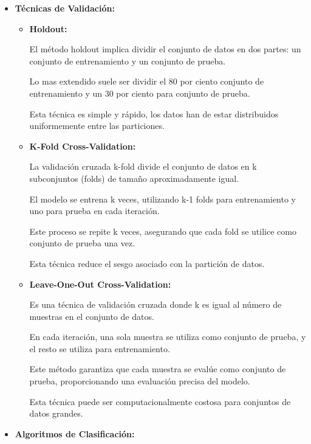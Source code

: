 \begin{itemize}

\item
\textbf{Técnicas de Validación:}

	\begin{itemize}
	
	\item
	\textbf{Holdout:}
	
	El método holdout implica dividir el conjunto de datos en dos partes: un conjunto de entrenamiento y un conjunto de prueba.
	
	Lo mas extendido suele ser dividir el 80 por ciento conjunto de entrenamiento y un 30 por ciento para conjunto de prueba.
	
	Esta técnica es simple y rápido, los datos han de estar distribuidos uniformemente entre las particiones.

	\item
	\textbf{K-Fold Cross-Validation:}
	
	
	La validación cruzada k-fold divide el conjunto de datos en k subconjuntos (folds) de tamaño aproximadamente igual.
	
	El modelo se entrena k veces, utilizando k-1 folds para entrenamiento y uno para prueba en cada iteración.
	
	Este proceso se repite k veces, asegurando que cada fold se utilice como conjunto de prueba una vez.
	
	Esta técnica reduce el sesgo asociado con la partición de datos.	
	
	\item
	\textbf{Leave-One-Out Cross-Validation:}
	
	Es una técnica de validación cruzada donde k es igual al número de muestras en el conjunto de datos.
	
	En cada iteración, una sola muestra se utiliza como conjunto de prueba, y el resto se utiliza para entrenamiento.
	
	Este método garantiza que cada muestra se evalúe como conjunto de prueba, proporcionando una evaluación precisa del modelo.
	
	Esta técnica puede ser computacionalmente costosa para conjuntos de datos grandes.
		
	\end{itemize}
	
	
\item
\textbf{Algoritmos de Clasificación:}	
	
	\begin{itemize}
	

\end{itemize}
\end{itemize}
